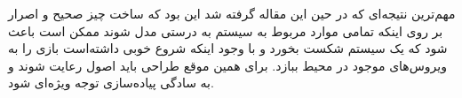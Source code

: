 \documentclass[a4paper, 12pt]{article}
\begin{document}
مهم‌ترین نتیجه‌ای که در حین این مقاله گرفته شد این بود که ساخت چیز صحیح و اصرار بر روی اینکه
تمامی موارد مربوط به سیستم به درستی مدل شوند ممکن است باعث شود که یک سیستم شکست بخورد
و با وجود اینکه شروع خوبی داشته‌است بازی را به ویروس‌های موجود در محیط ببازد.
برای همین موقع طراحی باید اصول
رعایت شوند و به سادگی پیاده‌سازی توجه ویژه‌ای شود.

\end{document}

